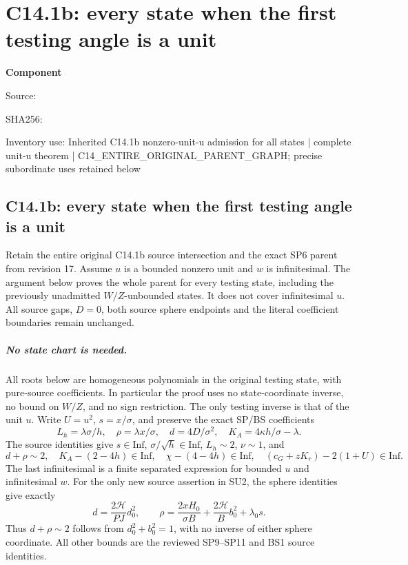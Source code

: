 \chapter{C14.1b: every state when the first testing angle is a unit}
\label{component:pcc84202479d2}
\noindent\textbf{Component }\par
{\small\noindent Source: \par}
{\small\noindent SHA256: \par}
{\small\noindent Inventory use: Inherited C14.1b nonzero-unit-u admission for all states | complete unit-u theorem | C14\_\allowbreak{}ENTIRE\_\allowbreak{}ORIGINAL\_\allowbreak{}PARENT\_\allowbreak{}GRAPH; precise subordinate uses retained below\par}
\medskip
\section{C14.1b: every state when the first testing angle is a unit}
\label{pcc84202479d2:sec:r18-sphere-unit-u}

Retain the entire original C14.1b source intersection and the exact
SP6 parent from revision 17.  Assume $u$ is a bounded nonzero unit
and $w$ is infinitesimal.  The argument below proves the whole parent
for every testing state, including the previously unadmitted
$W/Z$-unbounded states.  It does not cover infinitesimal $u$.
All source gaps, $D=0$, both source sphere endpoints and the literal
coefficient boundaries remain unchanged.

\paragraph{No state chart is needed.}
All roots below are homogeneous polynomials in the original testing
state, with pure-source coefficients.  In particular the proof
uses no state-coordinate inverse, no bound on $W/Z$, and no sign
restriction.  The only testing inverse is that of the unit $u$.
Write $U=u^2$, $s=x/\sigma$, and preserve the exact SP/BS coefficients
\[
 L_h=\lambda\sigma/h,\quad \rho=\lambda x/\sigma,
 \quad d=4D/\sigma^2,\quad K_A=4\kappa h/\sigma-\lambda.
\]
The source identities give $s\in\mathrm{Inf}$,
$\sigma/\sqrt h\in\mathrm{Inf}$, $L_h\sim2$, $\nu\sim1$, and
\[
 d+\rho\sim2,\quad K_A-(2-4h)\in\mathrm{Inf},\quad
 \chi-(4-4h)\in\mathrm{Inf},\quad
 (c_G+zK_r)-2(1+U)\in\mathrm{Inf}.
 \tag{SU2}
\]
The last infinitesimal is a finite separated expression for bounded
$u$ and infinitesimal $w$.  For the only new source assertion in
SU2, the sphere identities give exactly
\[
 d=\frac{2\mathcal H}{PJ}d_0^2,\qquad
 \rho=\frac{2xH_0}{\sigma B}
       +\frac{2\mathcal H}{B}b_0^2+\lambda_0s.
 \tag{SU3}
\]
Thus $d+\rho\sim2$ follows from $d_0^2+b_0^2=1$, with no inverse
of either sphere coordinate.  All other bounds are the reviewed
SP9--SP11 and BS1 source identities.

